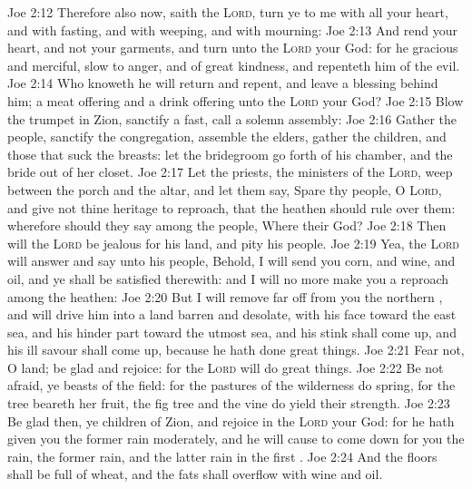 \vs Joe 2:12 Therefore also now, saith the \textsc{Lord}, turn ye  to me with all your heart, and with fasting, and with weeping, and with mourning:
\vs Joe 2:13 And rend your heart, and not your garments, and turn unto the \textsc{Lord} your God: for he  gracious and merciful, slow to anger, and of great kindness, and repenteth him of the evil.
\vs Joe 2:14 Who knoweth  he will return and repent, and leave a blessing behind him;  a meat offering and a drink offering unto the \textsc{Lord} your God?
\vs Joe 2:15 Blow the trumpet in Zion, sanctify a fast, call a solemn assembly:
\vs Joe 2:16 Gather the people, sanctify the congregation, assemble the elders, gather the children, and those that suck the breasts: let the bridegroom go forth of his chamber, and the bride out of her closet.
\vs Joe 2:17 Let the priests, the ministers of the \textsc{Lord}, weep between the porch and the altar, and let them say, Spare thy people, O \textsc{Lord}, and give not thine heritage to reproach, that the heathen should rule over them: wherefore should they say among the people, Where  their God?
\vs Joe 2:18 Then will the \textsc{Lord} be jealous for his land, and pity his people.
\vs Joe 2:19 Yea, the \textsc{Lord} will answer and say unto his people, Behold, I will send you corn, and wine, and oil, and ye shall be satisfied therewith: and I will no more make you a reproach among the heathen:
\vs Joe 2:20 But I will remove far off from you the northern , and will drive him into a land barren and desolate, with his face toward the east sea, and his hinder part toward the utmost sea, and his stink shall come up, and his ill savour shall come up, because he hath done great things.
\vs Joe 2:21 Fear not, O land; be glad and rejoice: for the \textsc{Lord} will do great things.
\vs Joe 2:22 Be not afraid, ye beasts of the field: for the pastures of the wilderness do spring, for the tree beareth her fruit, the fig tree and the vine do yield their strength.
\vs Joe 2:23 Be glad then, ye children of Zion, and rejoice in the \textsc{Lord} your God: for he hath given you the former rain moderately, and he will cause to come down for you the rain, the former rain, and the latter rain in the first .
\vs Joe 2:24 And the floors shall be full of wheat, and the fats shall overflow with wine and oil.
